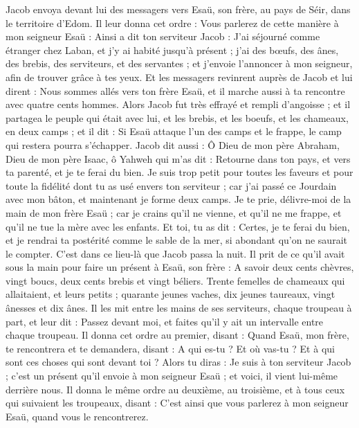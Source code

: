 \begin{multicols}{2}
Jacob envoya devant lui des messagers vers Esaü, son frère, au pays de Séir, dans le territoire d'Edom.
Il leur donna cet ordre : Vous parlerez de cette manière à mon seigneur Esaü : Ainsi a dit ton serviteur Jacob : J'ai séjourné comme étranger chez Laban, et j'y ai habité jusqu'à présent ;
j'ai des bœufs, des ânes, des brebis, des serviteurs, et des servantes ; et j'envoie l'annoncer à mon seigneur, afin de trouver grâce à tes yeux.
Et les messagers revinrent auprès de Jacob et lui dirent : Nous sommes allés vers ton frère Esaü, et il marche aussi à ta rencontre avec quatre cents hommes.
Alors Jacob fut très effrayé et rempli d'angoisse ; et il partagea le peuple qui était avec lui, et les brebis, et les boeufs, et les chameaux, en deux camps ; et il dit :
Si Esaü attaque l'un des camps et le frappe, le camp qui restera pourra s'échapper.
Jacob dit aussi : Ô Dieu de mon père Abraham, Dieu de mon père Isaac, ô Yahweh qui m'as dit : Retourne dans ton pays, et vers ta parenté, et je te ferai du bien.
Je suis trop petit pour toutes les faveurs et pour toute la fidélité dont tu as usé envers ton serviteur ; car j'ai passé ce Jourdain avec mon bâton, et maintenant je forme deux camps.
Je te prie, délivre-moi de la main de mon frère Esaü ; car je crains qu'il ne vienne, et qu'il ne me frappe, et qu'il ne tue la mère avec les enfants.
Et toi, tu as dit : Certes, je te ferai du bien, et je rendrai ta postérité comme le sable de la mer, si abondant qu'on ne saurait le compter.
C'est dans ce lieu-là que Jacob passa la nuit. Il prit de ce qu'il avait sous la main pour faire un présent à Esaü, son frère :
A savoir deux cents chèvres, vingt boucs, deux cents brebis et vingt béliers.
Trente femelles de chameaux qui allaitaient, et leurs petits ; quarante jeunes vaches, dix jeunes taureaux, vingt ânesses et dix ânes.
Il les mit entre les mains de ses serviteurs, chaque troupeau à part, et leur dit : Passez devant moi, et faites qu'il y ait un intervalle entre chaque troupeau.
Il donna cet ordre au premier, disant : Quand Esaü, mon frère, te rencontrera et te demandera, disant : A qui es-tu ? Et où vas-tu ? Et à qui sont ces choses qui sont devant toi ?
Alors tu diras : Je suis à ton serviteur Jacob ; c'est un présent qu'il envoie à mon seigneur Esaü ; et voici, il vient lui-même derrière nous.
Il donna le même ordre au deuxième, au troisième, et à tous ceux qui suivaient les troupeaux, disant : C'est ainsi que vous parlerez à mon seigneur Esaü, quand vous le rencontrerez.

\end{multicols}
